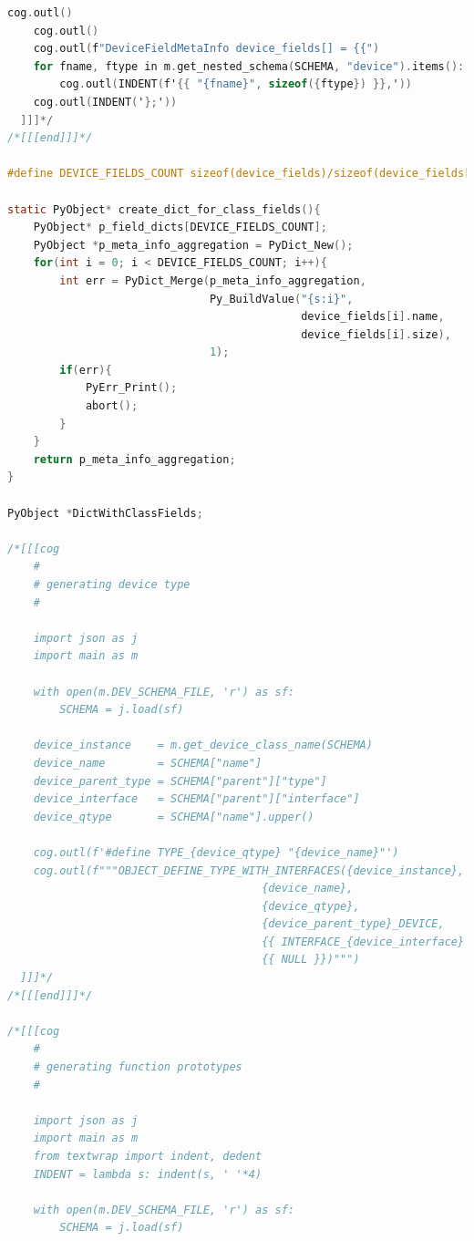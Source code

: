 \begin{lstlisting}[language={C},basicstyle=\tiny,stepnumber=1,caption={Шаблон устройства},label={lst:core.template.c}]
    cog.outl()
    cog.outl()
    cog.outl(f"DeviceFieldMetaInfo device_fields[] = {{")
    for fname, ftype in m.get_nested_schema(SCHEMA, "device").items():
        cog.outl(INDENT(f'{{ "{fname}", sizeof({ftype}) }},'))
    cog.outl(INDENT('};'))
  ]]]*/
/*[[[end]]]*/

#define DEVICE_FIELDS_COUNT sizeof(device_fields)/sizeof(device_fields[0])

static PyObject* create_dict_for_class_fields(){
    PyObject* p_field_dicts[DEVICE_FIELDS_COUNT];
    PyObject *p_meta_info_aggregation = PyDict_New();
    for(int i = 0; i < DEVICE_FIELDS_COUNT; i++){
        int err = PyDict_Merge(p_meta_info_aggregation,
                               Py_BuildValue("{s:i}",
                                             device_fields[i].name,
                                             device_fields[i].size),
                               1);
        if(err){
            PyErr_Print();
            abort();
        }
    }
    return p_meta_info_aggregation;
}

PyObject *DictWithClassFields;

/*[[[cog
    #
    # generating device type
    #

    import json as j
    import main as m

    with open(m.DEV_SCHEMA_FILE, 'r') as sf:
        SCHEMA = j.load(sf)

    device_instance    = m.get_device_class_name(SCHEMA)
    device_name        = SCHEMA["name"]
    device_parent_type = SCHEMA["parent"]["type"]
    device_interface   = SCHEMA["parent"]["interface"]
    device_qtype       = SCHEMA["name"].upper()

    cog.outl(f'#define TYPE_{device_qtype} "{device_name}"')
    cog.outl(f"""OBJECT_DEFINE_TYPE_WITH_INTERFACES({device_instance},
                                       {device_name},
                                       {device_qtype},
                                       {device_parent_type}_DEVICE,
                                       {{ INTERFACE_{device_interface} }},
                                       {{ NULL }})""")
  ]]]*/
/*[[[end]]]*/

/*[[[cog
    #
    # generating function prototypes
    #

    import json as j
    import main as m
    from textwrap import indent, dedent
    INDENT = lambda s: indent(s, ' '*4)

    with open(m.DEV_SCHEMA_FILE, 'r') as sf:
        SCHEMA = j.load(sf)


\end{lstlisting}
